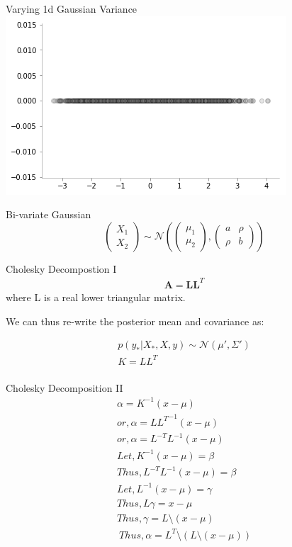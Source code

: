 \documentclass{beamer}
\begin{document}
  \begin{frame}{Varying 1d Gaussian Variance}
\includegraphics[width=\textwidth]{gp/1d-lineplot}
\end{frame}

\begin{frame}{Bi-variate Gaussian}
$$
\begin{pmatrix}
X_1 \\
X_2
\end{pmatrix}  \sim \mathcal{N} \left( \begin{pmatrix}
\mu_1 \\
\mu_2
\end{pmatrix} , \begin{pmatrix}
a &\rho \\
\rho & b
\end{pmatrix} \right)
$$
\end{frame}


\begin{frame}{Cholesky Decompostion I}
\begin{align*}
\mathbf{A} = \mathbf{L L}^T
\end{align*}
where L is a real lower triangular matrix.


We can thus re-write the posterior mean and covariance as:

\begin{align*}
p(y_*|X_*, X, y) \sim \mathcal{N}(\mu', \Sigma') \\
K = LL^T \\
\end{align*}
\end{frame}

\begin{frame}{Cholesky Decomposition II}
\begin{align*}
\alpha = K^{-1}(x-\mu) \\
or, \alpha = {LL^T}^{-1}(x-\mu) \\
or, \alpha = L^{-T}L^{-1}(x-\mu) \\
Let, K^{-1}(x-\mu) = \beta \\
Thus, L^{-T}L^{-1}(x-\mu) = \beta \\
Let, L^{-1}(x-\mu) = \gamma\\
Thus, L\gamma = x-\mu \\
Thus, \gamma = L \setminus (x-\mu)\\\
Thus, \alpha = L^{T} \setminus (L \setminus (x-\mu))
\end{align*}

\end{frame}
\end{document}
